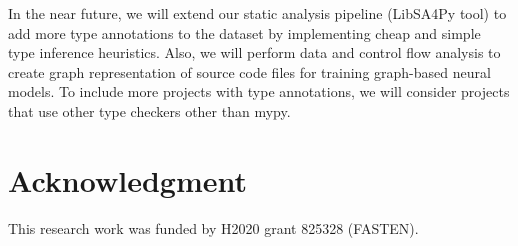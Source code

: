 \documentclass[10pt, conference]{IEEEtran}
\begin{document}
In the near future, we will extend our static analysis pipeline (LibSA4Py tool) to add more type annotations to the dataset by implementing cheap and simple type inference heuristics. Also, we will perform data and control flow analysis to create graph representation of source code files for training graph-based neural models. To include more projects with type annotations, we will consider projects that use other type checkers other than mypy.

\section*{Acknowledgment}
This research work was funded by H2020 grant 825328 (FASTEN).



\end{document}
